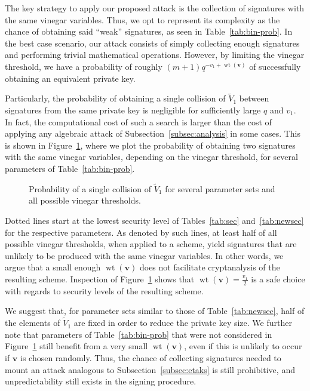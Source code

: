 \documentclass[12pt, a4paper, oneside]{memoir}
\DeclareMathOperator*{\wt}{wt}
\theoremstyle{definition}
\begin{document}
The key strategy to apply our proposed attack is the collection of signatures with the same vinegar variables. Thus, we opt to represent its complexity as the chance of obtaining said ``weak'' signatures, as seen in Table~\ref{tab:bin-prob}. In the best case scenario, our attack consists of simply collecting enough signatures and performing trivial mathematical operations. However, by limiting the vinegar threshold, we have a probability of roughly $(m + 1) q^{-v_{1} + \wt(\mathbf{v})}$ of successfully obtaining an equivalent private key.

Particularly, the probability of obtaining a single collision of $\widetilde{V}_{1}$ between signatures from the same private key is negligible for sufficiently large $q$ and $v_{1}$. In fact, the computational cost of such a search is larger than the cost of applying any algebraic attack of Subsection~\ref{subsec:analysis} in some cases. This is shown in Figure~\ref{fig:prob-sec}, where we plot the probability of obtaining two signatures with the same vinegar variables, depending on the vinegar threshold, for several parameters of Table~\ref{tab:bin-prob}.

\begin{figure}[htbp]
  \centering
  \caption{Probability of a single collision of $\widetilde{V}_{1}$ for several parameter sets and all possible vinegar thresholds.}\label{fig:prob-sec}
\end{figure}

Dotted lines start at the lowest security level of Tables~\ref{tab:sec} and~\ref{tab:newsec} for the respective parameters. As denoted by such lines, at least half of all possible vinegar thresholds, when applied to a scheme, yield signatures that are unlikely to be produced with the same vinegar variables. In other words, we argue that a small enough $\wt(\mathbf{v})$ does not facilitate cryptanalysis of the resulting scheme. Inspection of Figure~\ref{fig:prob-sec} shows that $\wt(\mathbf{v}) = \frac{v_{1}}{2}$ is a safe choice with regards to security levels of the resulting scheme. 

We suggest that, for parameter sets similar to those of Table~\ref{tab:newsec}, half of the elements of $\widetilde{V}_{1}$ are fixed in order to reduce the private key size. We further note that parameters of Table~\ref{tab:bin-prob} that were not considered in Figure~\ref{fig:prob-sec} still benefit from a very small $\wt(\mathbf{v})$, even if this is unlikely to occur if $\mathbf{v}$ is chosen randomly. Thus, the chance of collecting signatures needed to mount an attack analogous to  Subsection~\ref{subsec:etaks} is still prohibitive, and unpredictability still exists in the signing procedure.
\end{document}
